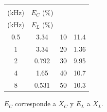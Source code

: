 \begin{center}
\begin{minipage}{\linewidth}\centering
\small
\setlength{\tabcolsep}{3pt}
\label{tab:errores_reactancias}
\begin{tabular}{cccc}
\toprule
\shortstack{$f_{\rm nom,RC}$\\(kHz)} & $E_C$ (\%) & \shortstack{$f_{\rm nom,RL}$\\(kHz)} & $E_L$ (\%) \\
\midrule
\num{0.5} & \num{3.34} & \num{10} & \num{11.4} \\
\num{1} & \num{3.34} & \num{20} & \num{1.36} \\
\num{2} & \num{0.792} & \num{30} & \num{9.95} \\
\num{4} & \num{1.65} & \num{40} & \num{10.7} \\
\num{8} & \num{0.531} & \num{50} & \num{10.3} \\
\bottomrule
\end{tabular}
\par\vspace{3pt}\begin{minipage}{.96\linewidth}\footnotesize $E_C$ corresponde a $X_C$ y $E_L$ a $X_L$.\end{minipage}
\end{minipage}
\end{center}
